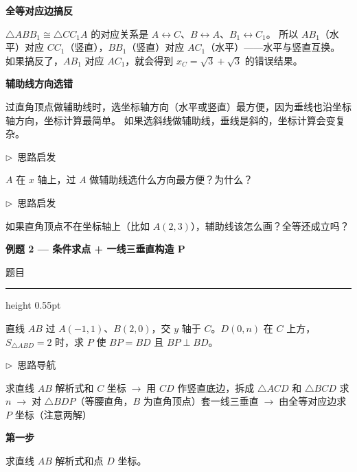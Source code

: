 \documentclass{exam-zh}
\newcommand{\edukai}{\kaishu}
\newcommand{\eduSectionTitle}[1]{%
  \needspace{5\baselineskip}%
  \vspace{2mm}
  {\color{edu-blue}\bfseries\large #1}\par
  \vspace{3mm}
}
\newcommand{\eduSubTitle}[1]{%
  \needspace{4\baselineskip}%
  \vspace{1mm}
  {\color{edu-blue}\bfseries #1}\par
  \vspace{1mm}
}
\newenvironment{eduSubQuestionItem}[1]{%
  \needspace{4\baselineskip}%
  \vspace{2mm}
  \par\noindent
  \hangindent=8mm\hangafter=1
  {\color{edu-blue}\bfseries #1}\enspace
  \begingroup
  \color{edu-ink}
}{%
  \endgroup
  \par
  \vspace{3mm}
}
\newenvironment{eduAuxItem}[1]{%
  \needspace{4\baselineskip}%
  \vspace{2mm}
  \par\noindent
  \hangindent=8mm\hangafter=1
  {\color{edu-blue}\edukai $\triangleright$~#1}\enspace
  \begingroup
  \color{edu-ink}
  \edukai
}{%
  \endgroup
  \par
  \vspace{4mm}
}
\newenvironment{eduProblemBlock}[1][题目]{%
  \needspace{8\baselineskip}
  {\small\color{edu-muted}#1}\par
  \vspace{1.5mm}
  {\color{edu-blue}\hrule height 0.55pt}
  \vspace{4.5mm}
  \begingroup
  \color{edu-ink}
  \large
  \setlength{\parskip}{2.2mm}
  \linespread{1.20}\selectfont
}{%
  \par
  \endgroup
  \vspace{6mm}
}
\begin{document}
\begin{eduMistakeBox}
\eduSubTitle{全等对应边搞反}$\triangle ABB_1 \cong \triangle CC_1A$ 的对应关系是 $A \leftrightarrow C$、$B \leftrightarrow A$、$B_1 \leftrightarrow C_1$。
所以 $AB_1$（水平）对应 $CC_1$（竖直），$BB_1$（竖直）对应 $AC_1$（水平）——水平与竖直互换。
如果搞反了，$AB_1$ 对应 $AC_1$，就会得到 $x_C = \sqrt{3} + \sqrt{3}$ 的错误结果。
\end{eduMistakeBox}




\begin{eduMistakeBox}
\eduSubTitle{辅助线方向选错}过直角顶点做辅助线时，选坐标轴方向（水平或竖直）最方便，因为垂线也沿坐标轴方向，坐标计算最简单。
如果选斜线做辅助线，垂线是斜的，坐标计算会变复杂。
\end{eduMistakeBox}




\begin{eduAuxItem}{思路启发}
$A$ 在 $x$ 轴上，过 $A$ 做辅助线选什么方向最方便？为什么？\end{eduAuxItem}




\begin{eduAuxItem}{思路启发}
如果直角顶点不在坐标轴上（比如 $A(2, 3)$），辅助线该怎么画？全等还成立吗？\end{eduAuxItem}



\clearpage
\eduSectionTitle{例题 2 — 条件求点 + 一线三垂直构造 P}

\begin{eduProblemBlock}[题目]
直线 $AB$ 过 $A(-1,1)$、$B(2,0)$，交 $y$ 轴于 $C$。$D(0,n)$ 在 $C$ 上方，$S_{\triangle ABD} = 2$ 时，求 $P$ 使 $BP = BD$ 且 $BP \perp BD$。

\end{eduProblemBlock}









\begin{eduAuxItem}{思路导航}
求直线 $AB$ 解析式和 $C$ 坐标$\;\to\;$用 $CD$ 作竖直底边，拆成 $\triangle ACD$ 和 $\triangle BCD$ 求 $n$$\;\to\;$对 $\triangle BDP$（等腰直角，$B$ 为直角顶点）套一线三垂直$\;\to\;$由全等对应边求 $P$ 坐标（注意两解）\end{eduAuxItem}




\begin{eduSubQuestionItem}{第一步}
求直线 $AB$ 解析式和点 $D$ 坐标。\end{eduSubQuestionItem}
\end{document}
